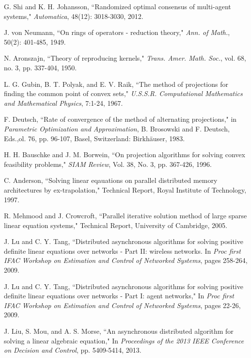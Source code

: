 \documentclass[a4paper, 11pt]{article}
\begin{document}
\begin{thebibliography}{99}
 G. Shi and  K. H. Johansson, ``Randomized optimal consensus of multi-agent systems,"  {\em Automatica}, 48(12): 3018-3030, 2012.

  J. von Neumann, ``On rings of operators - reduction theory," {\em  Ann. of Math.}, 50(2): 401-485, 1949.

 N. Aronszajn, ``Theory of reproducing kernels," {\em Trans. Amer. Math. Soc.},
vol. 68, no. 3, pp. 337-404, 1950.


 L. G. Gubin, B. T. Polyak, and E. V. Raik, ``The method of projections for finding the common point of convex sets," {\em U.S.S.R. Computational Mathematics and Mathematical Physics}, 7:1-24, 1967.

  F. Deutsch, ``Rate of convergence of the method of alternating projections,"
in {\em Parametric Optimization and Approximation}, B. Brosowski
and F. Deutsch, Eds.,ol. 76, pp. 96-107, Basel, Switzerland:
Birkh\"{a}user, 1983.

   H. H. Bauschke and J. M. Borwein,  ``On projection algorithms for solving convex
feasibility problems," {\em SIAM Review}, Vol. 38, No. 3, pp. 367-426,  1996.

  C. Anderson, ``Solving linear eqauations on parallel distributed memory architectures by ex-trapolation," Technical Report, Royal Institute of Technology, 1997.

 R. Mehmood and J. Crowcroft, ``Parallel iterative solution method of large sparse linear
equation systems," Technical Report, University of Cambridge, 2005.

 J. Lu and C. Y. Tang, ``Distributed asynchronous algorithms for solving
positive definite linear equations over networks - Part II: wireless
networks. In {\em Proc first IFAC Workshop on Estimation and Control of
Networked Systems}, pages 258-264, 2009.

 J. Lu and C. Y. Tang, ``Distributed asynchronous algorithms for solving
positive definite linear equations over networks - Part I: agent networks,"
In {\em Proc first IFAC Workshop on Estimation and Control of Networked
Systems}, pages 22-26, 2009.

 J. Liu, S. Mou, and A. S. Morse, ``An asynchronous distributed algorithm
for solving a linear algebraic equation,"  In {\em Proceedings of the 2013 IEEE
Conference on Decision and Control}, pp. 5409-5414, 2013.


\end{thebibliography}
\end{document}
